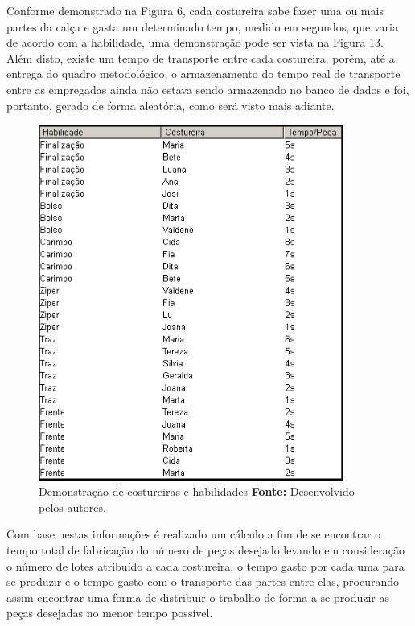 \par Conforme demonstrado na Figura 6, cada costureira sabe fazer uma ou mais partes da calça e gasta um 
determinado tempo, medido em segundos, que varia de acordo com a habilidade, uma demonstração pode ser vista na 
Figura 13. Além disto, existe um tempo de transporte entre cada costureira, porém, até a entrega do quadro 
metodológico, o armazenamento do tempo real de transporte entre as empregadas ainda não estava sendo armazenado no 
banco de dados e foi, portanto, gerado de forma aleatória, como será visto mais
adiante.

\newpage

\begin{figure}[h!]
	\centerline{\includegraphics[width=10cm]{./imagens/tempo_habilidade2.png}}
	\caption[Costureiras e Habilidades]
	{Demonstração de costureiras e habilidades \textbf{Fonte:} Desenvolvido pelos
	autores.}
	\label{fig:exemplo1}
\end{figure}

\par Com base nestas informações é realizado um cálculo a fim de se encontrar o tempo total de fabricação do número de peças
desejado levando em consideração o número de lotes atribuído a cada costureira, o tempo gasto por cada uma para se produzir e 
o tempo gasto com o transporte das partes entre elas, procurando assim encontrar
uma forma de distribuir o trabalho de forma a se produzir as peças desejadas no menor tempo possível. 

